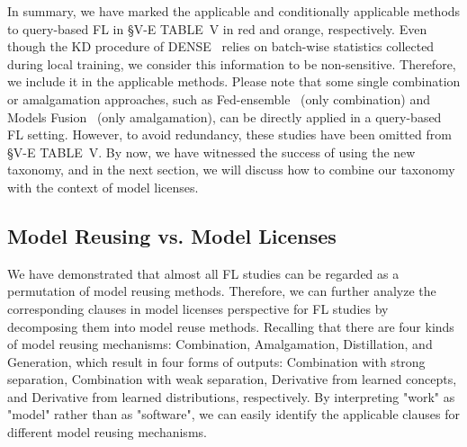 \documentclass[journal]{IEEEtran}
\begin{document}
In summary, we have marked the applicable and conditionally applicable methods to query-based FL in \S{V-E} TABLE~V in red and orange, respectively.
Even though the KD procedure of DENSE~\cite{zhang2022dense} relies on batch-wise statistics collected during local training, we consider this information to be non-sensitive. 
Therefore, we include it in the applicable methods.
Please note that some single combination or amalgamation approaches, such as Fed-ensemble~\cite{shi2023fed} (only combination) and Models Fusion~\cite{yurochkin2019bayesian, yurochkin2019statistical, lam2021model} (only amalgamation), can be directly applied in a query-based FL setting. 
However, to avoid redundancy, these studies have been omitted from \S{V-E} TABLE~V.
By now, we have witnessed the success of using the new taxonomy, and in the next section, we will discuss how to combine our taxonomy with the context of model licenses.


\subsection{Model Reusing vs. Model Licenses}
\label{sec:reusing&license}
We have demonstrated that almost all FL studies can be regarded as a permutation of model reusing methods. 
Therefore, we can further analyze the corresponding clauses in model licenses perspective for FL studies by decomposing them into model reuse methods.
Recalling that there are four kinds of model reusing mechanisms: Combination, Amalgamation, Distillation, and Generation, which result in four forms of outputs: Combination with strong separation, Combination with weak separation, Derivative from learned concepts, and Derivative from learned distributions, respectively.
By interpreting "work" as "model" rather than as "software", we can easily identify the applicable clauses for different model reusing mechanisms.
\end{document}
